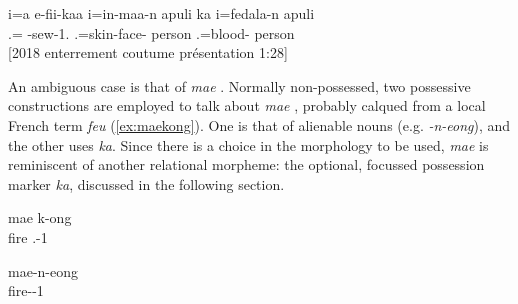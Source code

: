  \ea \label{ex:fedat}
 \gll i=a e-fii-kaa i=in-maa-n apuli ka i=fedala-n apuli \\ %
  .= -sew-1. .=skin-face- person  .=blood- person \\ %
 \glt {} {[}2018 enterrement coutume présentation 1:28]
 \z
 
 \begin{sloppypar}
 An ambiguous case is that of \textit{mae} . Normally non-possessed, two possessive constructions are employed to talk about \textit{mae} , probably calqued from a local French term \textit{feu}  (\ref{ex:maekong}). One is that of alienable nouns (e.g. \textit{-n-eong}), and the other uses \textit{ka}. Since there is a choice in the morphology to be used, \textit{mae} is reminiscent of another relational morpheme: the optional, focussed possession marker \textit{ka}, discussed in the following section.
 \end{sloppypar}


	\ea \label{ex:maekong}
	\gll mae k-ong\\	
	 fire .-1\\	
	\glt {}
	\z
	
	\ea
	\gll mae-n-eong\\	
	 fire--1\\
	\glt {}
	\z 


